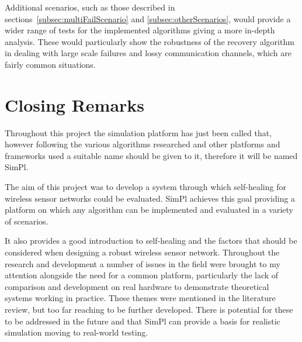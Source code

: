 \documentclass[authoryearcitations]{UoYCSproject}
\begin{document}
Additional scenarios, such as those described in sections~\ref{subsec:multiFailScenario} and \ref{subsec:otherScenarios}, would provide a wider range of tests for the implemented algorithms giving a more in-depth analysis. These would particularly show the robustness of the recovery algorithm in dealing with large scale failures and lossy communication channels, which are fairly common situations.

\section{Closing Remarks}

Throughout this project the simulation platform has just been called that, however following the various algorithms researched and other platforms and frameworks used a suitable name should be given to it, therefore it will be named SimPl.

The aim of this project was to develop a system through which self-healing for wireless sensor networks could be evaluated. SimPl achieves this goal providing a platform on which any algorithm can be implemented and evaluated in a variety of scenarios.

It also provides a good introduction to self-healing and the factors that should be considered when designing a robust wireless sensor network. Throughout the research and development a number of issues in the field were brought to my attention alongside the need for a common platform, particularly the lack of comparison and development on real hardware to demonstrate theoretical systems working in practice. These themes were mentioned in the literature review, but too far reaching to be further developed. There is potential for these to be addressed in the future and that SimPl can provide a basis for realistic simulation moving to real-world testing.



\end{document}
